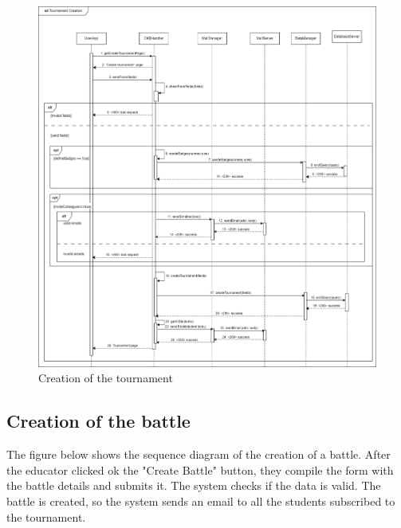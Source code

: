  \begin{figure}[H]
    \centering
    \includegraphics[width=1\textwidth]{images/seq_diagrams/tournament_creation_DD.png}
    \caption{Creation of the tournament}
\end{figure}
\clearpage

\subsection{Creation of the battle}
The figure below shows the sequence diagram of the creation of a battle. After the educator clicked ok the "Create Battle" button, they compile the form
 with the battle details and submits it. The system checks if the data is valid. The battle is created, so the system sends an email to all 
 the students subscribed to the tournament.\\  
 
